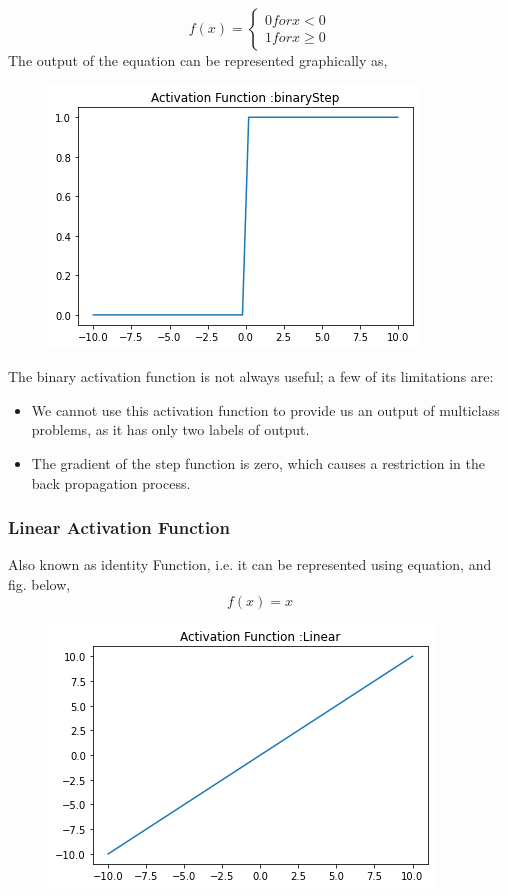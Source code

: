 \begin{equation} \label{eq:2}
   f(x) =  \begin{cases} 
      0 for x < 0 \\
      1 for x \geq 0 
   \end{cases}
\end{equation}
The output of the equation can be represented graphically as,
\begin{figure}[H]
    \centering
    \includegraphics[scale=0.5]{Figure/binary.png}
    \label{fig:my_label}
\end{figure}
The binary activation function is not always useful; a few of its limitations are:
\begin{itemize}
    \item We cannot use this activation function to provide us an output of multiclass problems, as it has only two labels of output.
    \item The gradient of the step function is zero, which causes a restriction in the back propagation process.
\end{itemize}

 
\subsubsection{Linear Activation Function}
Also known as identity Function, i.e. it can be represented using equation, and fig. below,
\begin{equation}
    f(x) = x
\end{equation}

\begin{figure}[H]
    \centering
    \includegraphics[scale=0.6]{Figure/linear.png}
    \label{fig:my_label_02wwe}
\end{figure}


